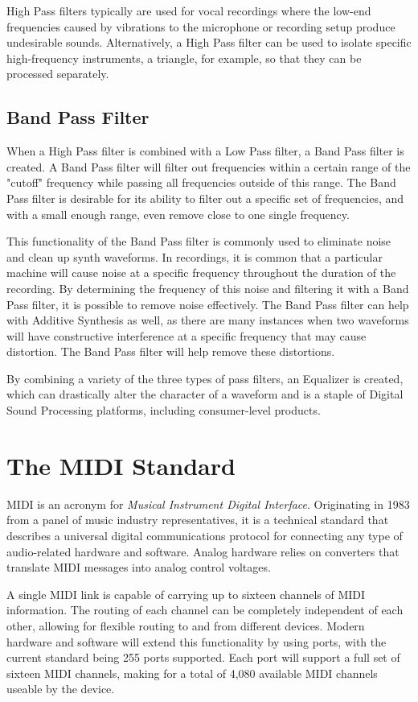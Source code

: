 \documentclass[a4paper,12pt]{report}
\begin{document}
High Pass filters typically are used for vocal recordings where the low-end frequencies caused by vibrations to the microphone or recording setup produce undesirable sounds. Alternatively, a High Pass filter can be used to isolate specific high-frequency instruments, a triangle, for example, so that they can be processed separately.

\subsection{Band Pass Filter}
When a High Pass filter is combined with a Low Pass filter, a Band Pass filter is created. A Band Pass filter will filter out frequencies within a certain range of the "cutoff" frequency while passing all frequencies outside of this range. The Band Pass filter is desirable for its ability to filter out a specific set of frequencies, and with a small enough range, even remove close to one single frequency.

This functionality of the Band Pass filter is commonly used to eliminate noise and clean up synth waveforms. In recordings, it is common that a particular machine will cause noise at a specific frequency throughout the duration of the recording. By determining the frequency of this noise and filtering it with a Band Pass filter, it is possible to remove noise effectively. The Band Pass filter can help with Additive Synthesis as well, as there are many instances when two waveforms will have constructive interference at a specific frequency that may cause distortion. The Band Pass filter will help remove these distortions.

By combining a variety of the three types of pass filters, an Equalizer is created, which can drastically alter the character of a waveform and is a staple of Digital Sound Processing platforms, including consumer-level products.


\section{The MIDI Standard}
MIDI is an acronym for \emph{Musical Instrument Digital Interface}. Originating in 1983 from a panel of music industry representatives, it is a technical standard that describes a universal digital communications protocol for connecting any type of audio-related hardware and software. Analog hardware relies on converters that translate MIDI messages into analog control voltages. 

A single MIDI link is capable of carrying up to sixteen channels of MIDI information. The routing of each channel can be completely independent of each other, allowing for flexible routing to and from different devices. Modern hardware and software will extend this functionality by using ports, with the current standard being 255 ports supported. Each port will support a full set of sixteen MIDI channels, making for a total of 4,080 available MIDI channels useable by the device.
\end{document}
